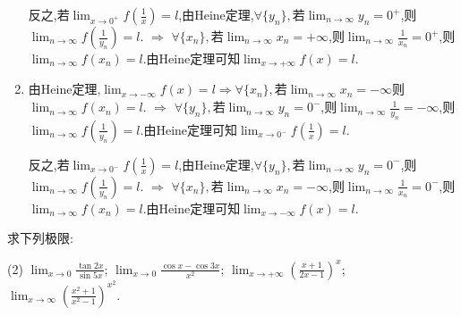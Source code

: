 \begin{solution}
\begin{enumerate}[(1)]
              反之,若$\lim_{x \to 0^+} f\left(\frac{1}{x}\right)=l$,由Heine定理,$\forall \{y_n\},$若$\lim_{n \to \infty} y_n = 0^+$,则$\lim_{n \to \infty} f\left( \frac{1}{y_n} \right) = l$. $\Rightarrow$ $\forall \{x_n\},$若$\lim_{n \to \infty} x_n = +\infty$,则$\lim_{n \to \infty} \frac{1}{x_n} = 0^+$,则$\lim_{n \to \infty} f(x_n) = l$.由Heine定理可知$\lim_{x \to +\infty} f(x) = l$.

        \item 由Heine定理,$\lim_{x \to -\infty} f(x) = l \Rightarrow \forall \{x_n\},$若$\lim_{n \to \infty} x_n = -\infty$则$\lim_{n \to \infty} f(x_n) = l$. $\Rightarrow$ $\forall \{ y_n \},$若$\lim_{n \to \infty} y_n = 0^-$,则$\lim_{n \to \infty} \frac{1}{y_n} = -\infty$,则$\lim_{n \to \infty} f\left( \frac{1}{y_n} \right) = l$.由Heine定理可知$\lim_{x \to 0^-} f\left(\frac{1}{x}\right)=l$.

              反之,若$\lim_{x \to 0^-} f\left(\frac{1}{x}\right)=l$,由Heine定理,$\forall \{y_n\},$若$\lim_{n \to \infty} y_n = 0^-$,则$\lim_{n \to \infty} f\left( \frac{1}{y_n} \right) = l$. $\Rightarrow$ $\forall \{x_n\},$若$\lim_{n \to \infty} x_n = -\infty$,则$\lim_{n \to \infty} \frac{1}{x_n} = 0^-$,则$\lim_{n \to \infty} f(x_n) = l$.由Heine定理可知$\lim_{x \to -\infty} f(x) = l$.
    \end{enumerate}
\end{solution}

\begin{exercise}[1.3.9]
    求下列极限:
    \begin{tasks}[label=(\arabic*)](2)
        \task $\lim_{x \to 0} \frac{\tan 2x}{\sin 5x}$;
        \task $\lim_{x \to 0} \frac{\cos x - \cos 3x}{x^2}$;
        \task $\lim_{x \to +\infty} \left(\frac{x+1}{2x-1}\right)^x$;
        \task $\lim_{x \to \infty} \left(\frac{x^2+1}{x^2-1}\right)^{x^2}$.
    \end{tasks}
\end{exercise}

